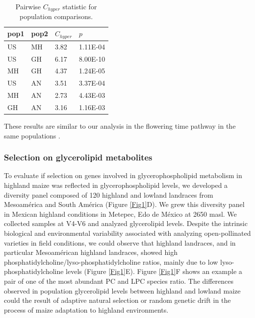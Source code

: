 \documentclass[9pt,twocolumn,twoside]{BioRxiv}
\begin{document}
\begin{table}[]
\centering
\begin{tabular}{@{}llll@{}}
\toprule
pop1 & pop2 & $C_{hyper}$   & $p$  \\ \midrule
US   & MH   & 3.82 & 1.11E-04 \\
US   & GH   & 6.17 & 8.00E-10 \\
MH   & GH   & 4.37 & 1.24E-05 \\
US   & AN   & 3.51 & 3.37E-04 \\
MH   & AN   & 2.73 & 4.43E-03 \\
GH   & AN   & 3.16 & 1.16E-03 \\ \bottomrule
\end{tabular}
\caption{Pairwise $C_{hyper}$ statistic for population comparisons.}
\label{tab:table1}
\end{table}

These results are similar to our analysis in the flowering time pathway in the same populations \cite{Wang2020-mp}. 

\subsubsection{Selection on glycerolipid metabolites} 
To evaluate if selection on genes involved in glycerophospholipid metabolism in highland maize was reflected in glycerophospholipid levels, we developed a diversity panel composed of 120 highland and lowland landraces from Mesoamérica and South América (Figure \ref{Fig1}D). 
We grew this diversity panel in Mexican highland conditions in Metepec, Edo de México at 2650 masl.
We collected samples at V4-V6 and analyzed glycerolipid levels. 
Despite the intrinsic biological and environmental variability associated with analyzing open-pollinated varieties in field conditions, we could observe that highland landraces, and in particular Mesoamérican highland landraces, showed  high phosphatidylcholine/lyso-phosphatidylcholine ratios, mainly due to low lyso-phosphatidylcholine levels (Figure \ref{Fig1}E). 
Figure \ref{Fig1}F shows an example a pair of one of the most abundant PC and LPC species ratio. 
The differences observed in population glycerolipid levels between highland and lowland maize could the result of adaptive natural selection or random genetic drift in the process of maize adaptation to highland environments.
\end{document}
